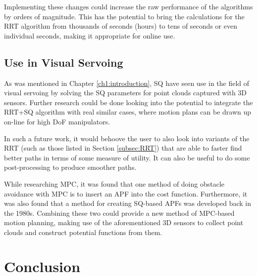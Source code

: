 Implementing these changes could increase the raw performance of the algorithms by orders of magnitude. This has the potential to bring the calculations for the \gls{RRT} algorithm from thousands of seconds (hours) to tens of seconds or even individual seconds, making it appropriate for online use.

%

\subsection{Use in Visual Servoing}

As was mentioned in Chapter \ref{ch1:introduction}, \gls{SQ} have seen use in the field of visual servoing by solving the \gls{SQ} parameters for point clouds captured with 3D sensors. Further research could be done looking into the potential to integrate the \gls{RRT}+\gls{SQ} algorithm with real similar cases, where motion plans can be drawn up on-line for high \gls{DoF} manipulators.

In such a future work, it would behoove the user to also look into variants of the \gls{RRT} (such as those listed in Section \ref{subsec:RRT}) that are able to faster find better paths in terms of some measure of utility. It can also be useful to do some post-processing to produce smoother paths.

While researching \gls{MPC}, it was found that one method of doing obstacle avoidance with \gls{MPC} is to insert an \gls{APF} into the cost function. Furthermore, it was also found that a method for creating \gls{SQ}-based \gls{APF}s was developed back in the 1980s. Combining these two could provide a new method of \gls{MPC}-based motion planning, making use of the aforementioned 3D sensors to collect point clouds and construct potential functions from them.

\section{Conclusion}

